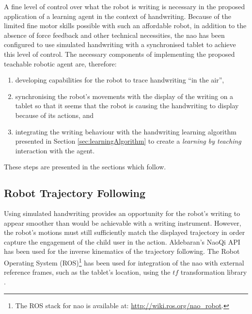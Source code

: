 \documentclass{sig-alternate}
\begin{document}
A fine level of control over what the robot is writing is necessary in the
proposed application of a learning agent in the context of handwriting. Because
of the limited fine motor skills possible with such an affordable robot, in
addition to the absence of force feedback and other technical necessities, the
{\sc nao} has been configured to use simulated handwriting with a synchronised tablet
to achieve this level of control. The necessary components of implementing the
proposed teachable robotic agent are, therefore:

\begin{enumerate}
    \item developing capabilities for the robot to trace handwriting ``in the air'', 

    \item synchronising the robot's movements with the display of the writing on a
        tablet so that it seems that the robot is causing the handwriting to
        display because of its actions, and

    \item integrating the writing behaviour with the handwriting learning
        algorithm presented in Section \ref{sec:learningAlgorithm} to create a
        \emph{learning by teaching} interaction with the agent. 
\end{enumerate}

These steps are presented in the sections which follow.

\subsection{Robot Trajectory Following}

Using simulated handwriting provides an opportunity for the robot's writing to
appear smoother than would be achievable with a writing instrument. However, the
robot's motions must still sufficiently match the displayed trajectory in order
capture the engagement of the child user in the action. Aldebaran's NaoQi API
has been used for the inverse kinematics of the trajectory following. The Robot
Operating System (ROS)\footnote{The ROS stack for {\sc nao} is available at:
\url{http://wiki.ros.org/nao_robot}.} has been used for integration of the {\sc nao}
with external reference frames, such as the tablet's location, using the $tf$ transformation library \cite{Foote2013}.
\end{document}
